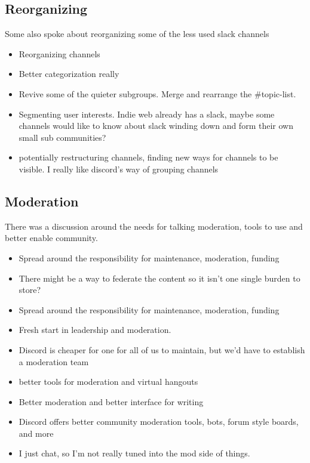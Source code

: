 \documentclass[
]{book}
\providecommand{\tightlist}{%
  \setlength{\itemsep}{0pt}\setlength{\parskip}{0pt}}
\begin{document}
\subsection{Reorganizing}\label{reorganizing}

Some also spoke about reorganizing some of the less used slack channels

\begin{itemize}
\tightlist
\item
  Reorganizing channels
\item
  Better categorization really
\item
  Revive some of the quieter subgroups. Merge and rearrange the \#topic-list.
\item
  Segmenting user interests. Indie web already has a slack, maybe some channels would like to know about slack winding down and form their own small sub communities?
\item
  potentially restructuring channels, finding new ways for channels to be visible. I really like discord's way of grouping channels
\end{itemize}

\subsection{Moderation}\label{moderation}

There was a discussion around the needs for talking moderation, tools to use and better enable community.

\begin{itemize}
\tightlist
\item
  Spread around the responsibility for maintenance, moderation, funding
\item
  There might be a way to federate the content so it isn't one single burden to store?
\item
  Spread around the responsibility for maintenance, moderation, funding
\item
  Fresh start in leadership and moderation.
\item
  Discord is cheaper for one for all of us to maintain, but we'd have to establish a moderation team
\item
  better tools for moderation and virtual hangouts
\item
  Better moderation and better interface for writing
\item
  Discord offers better community moderation tools, bots, forum style boards, and more
\item
  I just chat, so I'm not really tuned into the mod side of things.
\end{itemize}
\end{document}

